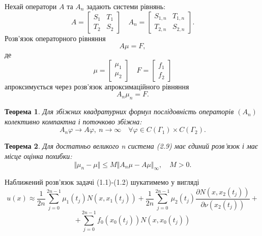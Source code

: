 \documentclass[a4 paper,12pt,ukrainian]{report}
\newtheorem{theorem}{\textbf{Теорема}}[chapter]
\begin{document}
\hspace*{\parindent}Нехай оператори $A$ та $A_{n}$ задають системи рівнянь:
\begin{equation*}
A=\left[
\begin{array}{cc}
S_{1}&T_{1}\\
T_{2}&S_{2}
\end{array}
\right]\quad
A_{n}=\left[
\begin{array}{cc}
S_{1,n}&T_{1,n}\\
T_{2,n}&S_{2,n}
\end{array}
\right].
\end{equation*}
\hspace*{\parindent}Розв'язок операторного рівняння
\begin{equation*}
A\mu=F,
\end{equation*}
де 
\begin{equation*}
\mu=\left[
\begin{array}{c}
\mu_{1}\\
\mu_{2}
\end{array}
\right]\quad
F=\left[
\begin{array}{c}
f_{1}\\
f_{2}
\end{array}
\right]
\end{equation*}
апроксимується через розв'язок апроксимаційного рівняння
\begin{equation*}
A_{n}\mu_{n}=F.
\end{equation*}
\begin{theorem}\cite{Kress}
Для збіжних квадратурних формул послідовність операторів $(A_{n})$ колективно компактна і поточково збіжна:
\begin{equation*}
A_{n}\varphi\rightarrow A\varphi, \ n\to\infty \quad \forall\varphi\in C(\Gamma_{1})\times C(\Gamma_{2}).
\end{equation*}
\end{theorem}
\begin{theorem}\cite{Kress}
Для достатньо великого n система (2.9) має єдиний розв'язок і має місце оцінка похибки:
\begin{equation*}
\Vert\mu_{n}-\mu\Vert\le M\Vert A_{n}\mu-A\mu\Vert_{\infty}, \quad M>0.
\end{equation*}
\end{theorem}
\hspace*{\parindent}Наближений розв'язок задачі (1.1)-(1.2) шукатимемо у вигляді
\begin{equation*}
u(x)\approx\frac{1}{2n}\sum\limits_{j=0}^{2n-1}{\mu_1(t_j)N(x,x_1(t_j))}+\frac{1}{2n}\sum\limits_{j=0}^{2n-1}{\mu_2(t_j)\frac{\partial N(x,x_2(t_j))}{\partial\nu(x_2(t_j))}}+
\end{equation*}
\begin{equation*}
+\sum\limits_{j=0}^{2n-1}{f_0(x_0(t_j))N(x,x_0(t_j))}
\end{equation*}
\end{document}
